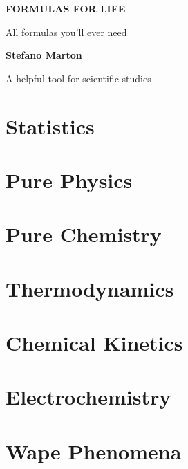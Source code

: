 \documentclass[a4,11pt]{report}
\makeatletter
\renewcommand\tableofcontents{%
	\begin{multicols}{2}[\section*{\contentsname
			  \@mkboth{%
				  \MakeUppercase\contentsname}{\MakeUppercase\contentsname}}]%
		\@starttoc{toc}%
	\end{multicols}%
}
\makeatother
\begin{document}
\begin{titlepage}
	\begin{center}
		\vspace*{6cm}

		\Huge
		\textbf{FORMULAS FOR LIFE}

		\vspace{0.5cm}
		\LARGE
		All formulas you'll ever need

		\vspace{1.5cm}

		\textbf{Stefano Marton}

		\vfill

		A helpful tool for scientific studies

		\vspace{0.8cm}

	\end{center}
\end{titlepage}

\tableofcontents

\chapter{Statistics}


\chapter{Pure Physics}


\chapter{Pure Chemistry}


\chapter{Thermodynamics}


\chapter{Chemical Kinetics}


\chapter{Electrochemistry}


\chapter{Wape Phenomena}

\end{document}
